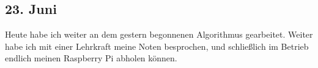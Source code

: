 \subsection{23. Juni}
Heute habe ich weiter an dem gestern begonnenen Algorithmus gearbeitet. Weiter habe ich mit einer Lehrkraft meine Noten besprochen, und schließlich im Betrieb endlich meinen Raspberry Pi abholen können.